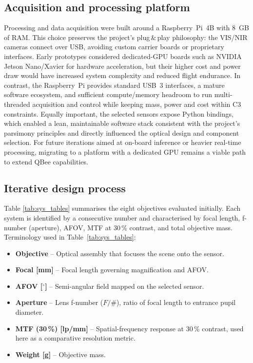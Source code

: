 \subsection{Acquisition and processing platform}

\noindent Processing and data acquisition were built around a Raspberry~Pi~4B with
8~GB of RAM. This choice preserves the project’s plug\,\&\,play philosophy:
the VIS/NIR cameras connect over USB, avoiding custom carrier boards or
proprietary interfaces. Early prototypes considered dedicated-GPU boards such as
NVIDIA Jetson Nano/Xavier for hardware acceleration, but their higher cost and
power draw would have increased system complexity and reduced flight endurance.
In contrast, the Raspberry~Pi provides standard USB~3 interfaces, a mature
software ecosystem, and sufficient compute/memory headroom to run multi-threaded
acquisition and control while keeping mass, power and cost within C3 constraints.
Equally important, the selected sensors expose Python bindings, which enabled a
lean, maintainable software stack consistent with the project’s parsimony
principles and directly influenced the optical design and component selection.
For future iterations aimed at on-board inference or heavier real-time
processing, migrating to a platform with a dedicated GPU remains a viable path
to extend QBee capabilities.

\subsection{Iterative design process}
\label{sec:cad}

Table \ref{tab:sys_tables} summarises the eight objectives evaluated
initially. Each system is identified by a consecutive number and
characterised by focal length, f-number (aperture), AFOV, MTF at 30\,\% contrast, and total
objective mass.\\

\noindent Terminology used in Table~\ref{tab:sys_tables}:
\begin{itemize}
  \item \textbf{Objective} – Optical assembly that focuses the scene onto the sensor.
  \item \textbf{Focal [mm]} – Focal length governing magnification and AFOV.
  \item \textbf{AFOV [$^{\circ}$]} – Semi-angular field mapped on the selected sensor.
  \item \textbf{Aperture} – Lens f-number ($F/\#$), ratio of focal length to entrance pupil diameter.
  \item \textbf{MTF (30\,\%) [lp/mm]} – Spatial-frequency response at 30\,\% contrast, used here as a comparative resolution metric.
  \item \textbf{Weight [g]} – Objective mass.
\end{itemize}

